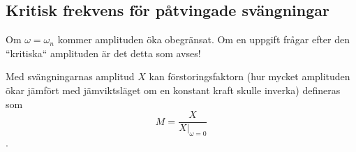 \documentclass{article}
\newenvironment{ankiflashcard}[1]{}{}
\begin{document}
\begin{paracol}{2}
\begin{ankiflashcard}{När ökar amplituden för påtvingade svängningar obegränsat?}
    \subsection{Kritisk frekvens för påtvingade svängningar}
    Om $\omega = \omega_n$ kommer amplituden öka obegränsat. Om en uppgift frågar efter den ``kritiska`` amplituden är det detta som avses!
\end{ankiflashcard}

\begin{ankiflashcard}{Definera förstorningsfaktor}
    Med svängningarnas amplitud $X$ kan förstoringsfaktorn (hur mycket amplituden ökar jämfört med jämviktsläget om en konstant kraft skulle inverka) defineras som
    $$M=\frac{X}{X|_{\omega=0}}$$.
\end{ankiflashcard}
\end{paracol}
\newpage
\end{document}

